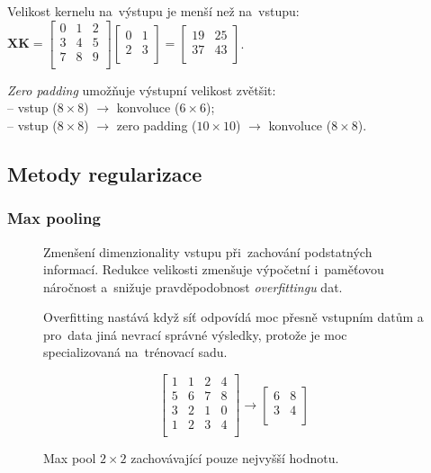 Velikost kernelu na~výstupu je menší než na~vstupu:
$\mathbf{X} \mathbf{K} = \left[ \begin{matrix}
0 & 1 & 2 \\
3 & 4 & 5 \\
7 & 8 & 9 \\
\end{matrix} \right] \left[ \begin{matrix}
0 & 1 \\
2 & 3 \\
\end{matrix} \right] = \left[ \begin{matrix}
19 & 25 \\
37 & 43 \\
\end{matrix} \right]$.

\emph{Zero padding} umožňuje výstupní velikost zvětšit:
\\-- vstup ($8 \times 8$) $\rightarrow$ konvoluce ($6 \times 6$);
\\-- vstup ($8 \times 8$) $\rightarrow$ zero padding ($10 \times 10$) $\rightarrow$ konvoluce ($8 \times 8$).

\subsection{Metody regularizace}

\subsubsection{Max pooling}

\begin{figure}[ht]
\onehalfspacing
\begin{minipage}[c]{0.68\textwidth}
    Zmenšení dimenzionality vstupu při~zachování podstatných informací.
    Redukce velikosti zmenšuje výpočetní i~paměťovou náročnost a~snižuje pravděpodobnost \emph{overfittingu} dat.

    \vspace*{1em}
    Overfitting nastává když síť odpovídá moc přesně vstupním datům a pro~data jiná nevrací správné výsledky, protože je moc specializovaná na~trénovací sadu.
\end{minipage}
\begin{minipage}[c]{0.30\textwidth}
    $$
    \left[\begin{matrix}
    1 & 1 & 2 & 4 \\
    5 & 6 & 7 & 8 \\
    3 & 2 & 1 & 0 \\
    1 & 2 & 3 & 4 \\
    \end{matrix} \right] \rightarrow \left[\begin{matrix}
    6 & 8 \\
    3 & 4 \\
    \end{matrix} \right]
    $$
    \caption{Max pool $2 \times 2$ zachovávající pouze nejvyšší hodnotu.}
\end{minipage}
\end{figure}
\FloatBarrier


